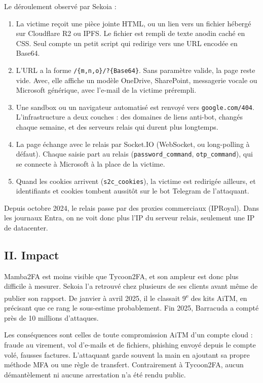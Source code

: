 \documentclass[10pt,a4paper]{article}
\begin{document}
Le déroulement observé par Sekoia :
\begin{enumerate}
  \item La victime reçoit une pièce jointe HTML, ou un lien vers un fichier hébergé sur Cloudflare R2 ou IPFS. Le fichier est rempli de texte anodin caché en CSS. Seul compte un petit script qui redirige vers une URL encodée en Base64.
  \item L'URL a la forme \texttt{/\{m,n,o\}/?\{Base64\}}. Sans paramètre valide, la page reste vide. Avec, elle affiche un modèle OneDrive, SharePoint, messagerie vocale ou Microsoft générique, avec l'e-mail de la victime prérempli.
  \item Une sandbox ou un navigateur automatisé est renvoyé vers \texttt{google.com/404}. L'infrastructure a deux couches : des domaines de liens anti-bot, changés chaque semaine, et des serveurs relais qui durent plus longtemps.
  \item La page échange avec le relais par Socket.IO (WebSocket, ou long-polling à défaut). Chaque saisie part au relais (\texttt{password\_command}, \texttt{otp\_command}), qui se connecte à Microsoft à la place de la victime.
  \item Quand les cookies arrivent (\texttt{s2c\_cookies}), la victime est redirigée ailleurs, et identifiants et cookies tombent aussitôt sur le bot Telegram de l'attaquant.
\end{enumerate}
Depuis octobre 2024, le relais passe par des proxies commerciaux (IPRoyal). Dans les journaux Entra, on ne voit donc plus l'IP du serveur relais, seulement une IP de datacenter.

\subsection{II. Impact}
Mamba2FA est moins visible que Tycoon2FA, et son ampleur est donc plus difficile à mesurer. Sekoia l'a retrouvé chez plusieurs de ses clients avant même de publier son rapport. De janvier à avril 2025, il le classait 9\textsuperscript{e} des kits AiTM, en précisant que ce rang le sous-estime probablement. Fin 2025, Barracuda a compté près de 10 millions d'attaques.

Les conséquences sont celles de toute compromission AiTM d'un compte cloud : fraude au virement, vol d'e-mails et de fichiers, phishing envoyé depuis le compte volé, fausses factures. L'attaquant garde souvent la main en ajoutant sa propre méthode MFA ou une règle de transfert. Contrairement à Tycoon2FA, aucun démantèlement ni aucune arrestation n'a été rendu public.
\end{document}
